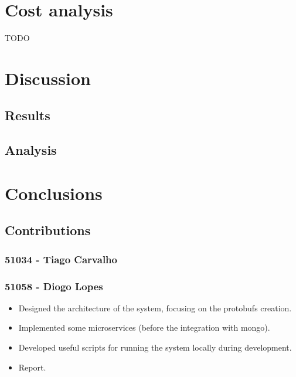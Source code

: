 \documentclass[oneside]{article}
\newcommand*\fpar{\hspace{1ex}}
\begin{document}
\section{Cost analysis}
\label{sec:cost}
\fpar TODO

\section{Discussion}
\label{sec:discussion}

  \subsection{Results}
  \label{sec:results}

  \subsection{Analysis}
  \label{sec:analysis}

\section{Conclusions}
\label{sec:conclusion}

  \subsection{Contributions}
  \label{sec:contributions}

    \subsubsection{51034 - Tiago Carvalho}
    \subsubsection{51058 - Diogo Lopes}
      \begin{itemize}
        \item Designed the architecture of the system, focusing on the protobufs creation.
        \item Implemented some microservices (before the integration with mongo).
        \item Developed useful scripts for running the system locally during development.
        \item Report.
      \end{itemize}
\end{document}
